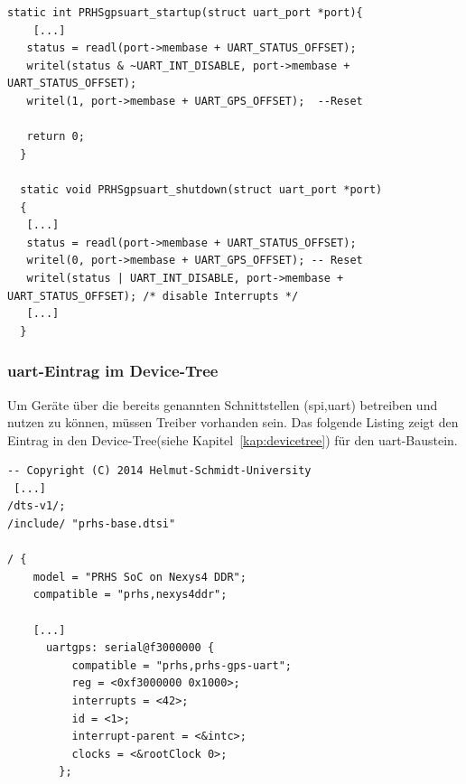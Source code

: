 \begin{lstlisting}[caption={Anpassung des \emph{Offset}-Bereichs im Treiber},label={code:driveroffset}]
  static int PRHSgpsuart_startup(struct uart_port *port){
    [...]
   status = readl(port->membase + UART_STATUS_OFFSET);
   writel(status & ~UART_INT_DISABLE, port->membase + UART_STATUS_OFFSET);
   writel(1, port->membase + UART_GPS_OFFSET);  --Reset

   return 0;
  }

  static void PRHSgpsuart_shutdown(struct uart_port *port)
  {
   [...]
   status = readl(port->membase + UART_STATUS_OFFSET);
   writel(0, port->membase + UART_GPS_OFFSET); -- Reset
   writel(status | UART_INT_DISABLE, port->membase + UART_STATUS_OFFSET); /* disable Interrupts */
   [...]
  }

 \end{lstlisting}


 \subsubsection{\ac{uart}-Eintrag im Device-Tree}\label{kap:uartdevicetree}

 Um Geräte über die bereits genannten Schnittstellen (\ac{spi},\ac{uart}) betreiben und nutzen zu können,
 müssen Treiber vorhanden sein. Das folgende Listing zeigt den Eintrag in den Device-Tree(siehe Kapitel~\ref{kap:devicetree})
 für den \ac{uart}-Baustein.\\

  \begin{lstlisting}[caption={Anlegen eines \ac{uart}-Device im \emph{Device-Tree}},label={code:uartdevicetree}]
  -- Copyright (C) 2014 Helmut-Schmidt-University
 [...]
/dts-v1/;
/include/ "prhs-base.dtsi"

/ {
    model = "PRHS SoC on Nexys4 DDR";
    compatible = "prhs,nexys4ddr";

    [...]
      uartgps: serial@f3000000 {
          compatible = "prhs,prhs-gps-uart";
          reg = <0xf3000000 0x1000>;
          interrupts = <42>;
          id = <1>;
          interrupt-parent = <&intc>;
          clocks = <&rootClock 0>;
        };

  \end{lstlisting}

